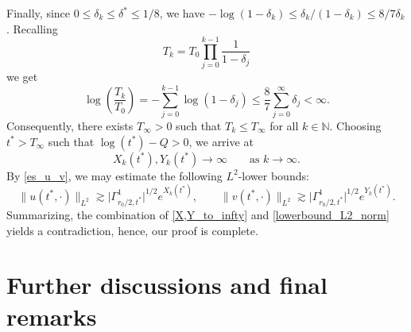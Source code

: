\documentclass[11pt,reqno]{amsart}
\newcommand{\tron}[1]{\left(#1\right)}
\begin{document}
	Finally, since $0\leq \delta_k\leq\delta^*\leq 1/8$, we have $-\log(1-\delta_k)\leq \delta_k/(1-\delta_k)\leq 8/7\delta_k$. Recalling
	\[
	T_k=T_0\prod_{j=0}^{k-1}\frac{1}{1-\delta_j}
	\]
	we get
	\[
	\log\tron{\frac{T_k}{T_0}}= -\sum_{j=0}^{k-1}\log(1-\delta_j)\leq\frac{8}{7}\sum_{j=0}^{\infty}\delta_j<\infty.
	\]
	Consequently, there exists $T_{\infty}>0$ such that $T_k\leq T_\infty$ for all $k\in\mathbb{N}$. Choosing $t^*>T_{\infty}$ such that $\log(t^*)-Q>0$, we arrive at 
	\begin{equation}\label{X,Y_to_infty}
		X_k(t^*),Y_k(t^*)\to\infty\qquad\text{as }k\to\infty.
	\end{equation}
	By \eqref{es_u_v}, we may estimate the following $L^2$-lower bounds:
	\begin{equation}\label{lowerbound_L2_norm}
		\|u(t^*,\cdot)\|_{L^2}\gtrsim \big|\Gamma^1_{r_0/2,t^*}\big|^{1/2}e^{X_k(t^*)},\qquad \|v(t^*,\cdot)\|_{L^2}\gtrsim \big|\Gamma^1_{r_0/2,t^*}\big|^{1/2}e^{Y_k(t^*)}.
	\end{equation}
	Summarizing, the combination of \eqref{X,Y_to_infty} and \eqref{lowerbound_L2_norm} yields a contradiction, hence, our proof is complete.
	
	\section{Further discussions and final remarks}\label{sec4}
	
\end{document}
